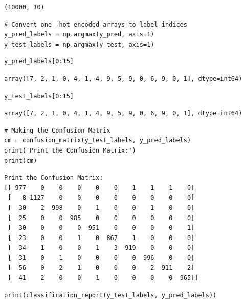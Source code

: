 \begin{verbatim}
(10000, 10)
\end{verbatim}

\begin{verbatim}
# Convert one -hot encoded arrays to label indices
y_pred_labels = np.argmax(y_pred, axis=1)
y_test_labels = np.argmax(y_test, axis=1)
\end{verbatim}

\begin{verbatim}
y_pred_labels[0:15]
\end{verbatim}

\begin{verbatim}
array([7, 2, 1, 0, 4, 1, 4, 9, 5, 9, 0, 6, 9, 0, 1], dtype=int64)
\end{verbatim}

\begin{verbatim}
y_test_labels[0:15]
\end{verbatim}

\begin{verbatim}
array([7, 2, 1, 0, 4, 1, 4, 9, 5, 9, 0, 6, 9, 0, 1], dtype=int64)
\end{verbatim}

\begin{verbatim}
# Making the Confusion Matrix
cm = confusion_matrix(y_test_labels, y_pred_labels)
print('Print the Confusion Matrix:')
print(cm)
\end{verbatim}

\begin{verbatim}
Print the Confusion Matrix:
[[ 977    0    0    0    0    0    1    1    1    0]
 [   8 1127    0    0    0    0    0    0    0    0]
 [  30    2  998    0    1    0    0    1    0    0]
 [  25    0    0  985    0    0    0    0    0    0]
 [  30    0    0    0  951    0    0    0    0    1]
 [  23    0    0    1    0  867    1    0    0    0]
 [  34    1    0    0    1    3  919    0    0    0]
 [  31    0    1    0    0    0    0  996    0    0]
 [  56    0    2    1    0    0    0    2  911    2]
 [  41    2    0    0    1    0    0    0    0  965]]
\end{verbatim}

\begin{verbatim}
print(classification_report(y_test_labels, y_pred_labels))
\end{verbatim}


